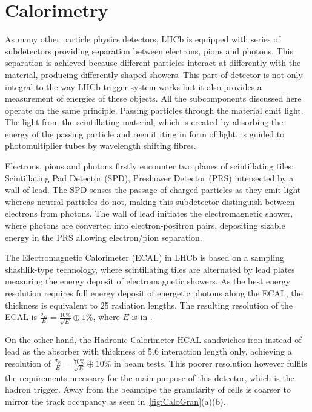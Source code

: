 \section{Calorimetry }
\label{calosys}
As many other particle physics detectors, \Gls{LHCb} is equipped with series of subdetectors providing separation between electrons, pions and photons. This separation is achieved because different particles interact at differently with the material, producing differently shaped showers. This part of detector is not only integral to the way \Gls{LHCb} trigger system works but it also provides a measurement of energies of these objects.
All the subcomponents discussed here operate on the same principle. Passing particles through the material emit light. The light from the scintillating material, which is created by absorbing the energy of the passing particle and reemit iting in form of light, is guided to photomultiplier tubes by wavelength shifting fibres.

Electrons, pions and photons firstly encounter two planes of scintillating tiles: Scintillating Pad Detector (\Gls{SPD}), Preshower Detector (\Gls{PRS}) intersected by a wall of lead. The \Gls{SPD} senses the passage of charged particles as they emit light whereas neutral particles do not, making this subdetector distinguish between electrons from photons. The wall of lead initiates the electromagnetic shower, where photons are converted into electron-positron pairs, depositing sizable energy in the \Gls{PRS} allowing electron/pion separation. 

The Electromagnetic Calorimeter (\Gls{ECAL}) in \gls{LHCb} is based on a sampling shashlik-type technology, where scintillating tiles are alternated by lead plates measuring the energy deposit of electromagnetic showers. As the best energy resolution requires full energy deposit of energetic photons along the \Gls{ECAL}, the thickness is equivalent to 25 radiation lengths. The resulting resolution of the \Gls{ECAL} is $\frac{\sigma_{E}}{E} = \frac{10\%}{\sqrt{E}} \oplus 1\%$, where $E$ is in \gev.

On the other hand, the Hadronic Calorimeter \Gls{HCAL} sandwiches iron instead of lead as the absorber with thickness of 5.6 interaction length only, achieving a resolution of $\frac{\sigma_{E}}{E} = \frac{70\%}{\sqrt{E}} \oplus 10\%$ in beam tests. This poorer resolution however fulfils the requirements necessary for the main purpose of this detector, which is the hadron trigger. Away from the beampipe the granularity of cells is coarser to mirror the track occupancy as seen in~\autoref{fig:CaloGran}(a)(b). 

